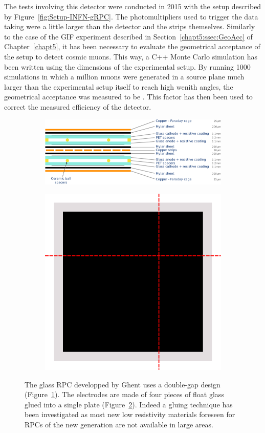     The tests involving this detector were conducted in 2015 with the setup described by Figure~\ref{fig:Setup-INFN-gRPC}. The photomultipliers used to trigger the data taking were a little larger than the detector and the strips themselves. Similarly to the case of the GIF experiment described in Section~\ref{chapt5:ssec:GeoAcc} of Chapter~\ref{chapt5}, it has been necessary to evaluate the geometrical acceptance of the setup to detect cosmic muons. This way, a C++ Monte Carlo simulation has been written using the dimensions of the experimental setup. By running 1000 simulations in which a million muons were generated in a source plane much larger than the experimental setup itself to reach high wenith angles, the geometrical acceptance was measured to be . This factor has then been used to correct the measured efficiency of the detector.
	 
	\begin{figure}[H]
		\begin{subfigure}{\linewidth}
		    \centering
			\includegraphics[width = .8\linewidth]{fig/chapt6/gRPC-design.pdf}
			\caption{\label{fig:UGent-gRPC-design:A}}
		\end{subfigure}
		\begin{subfigure}{\linewidth}
		    \centering
			\includegraphics[width = .35\linewidth]{fig/chapt6/gRPC-assembly.pdf}
			\caption{\label{fig:UGent-gRPC-design:B}}
		\end{subfigure}
		\caption{\label{fig:UGent-gRPC-design} The glass RPC developped by Ghent uses a double-gap design (Figure~\ref{fig:UGent-gRPC-design:A}). The electrodes are made of four pieces of float glass glued into a single plate (Figure~\ref{fig:UGent-gRPC-design:B}). Indeed a gluing technique has been investigated as most new low resistivity materials foreseen for RPCs of the new generation are not available in large areas.}
    \end{figure}
	 
